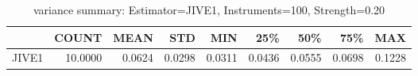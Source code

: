 \begin{table}[ht]
\centering
\caption{variance summary: Estimator=JIVE1, Instruments=100, Strength=0.20}
\begin{tabular}{lrrrrrrrr}
\toprule
 & COUNT & MEAN & STD & MIN & 25\% & 50\% & 75\% & MAX \\
\midrule
JIVE1 & 10.0000 & 0.0624 & 0.0298 & 0.0311 & 0.0436 & 0.0555 & 0.0698 & 0.1228 \\
\bottomrule
\end{tabular}
\end{table}
